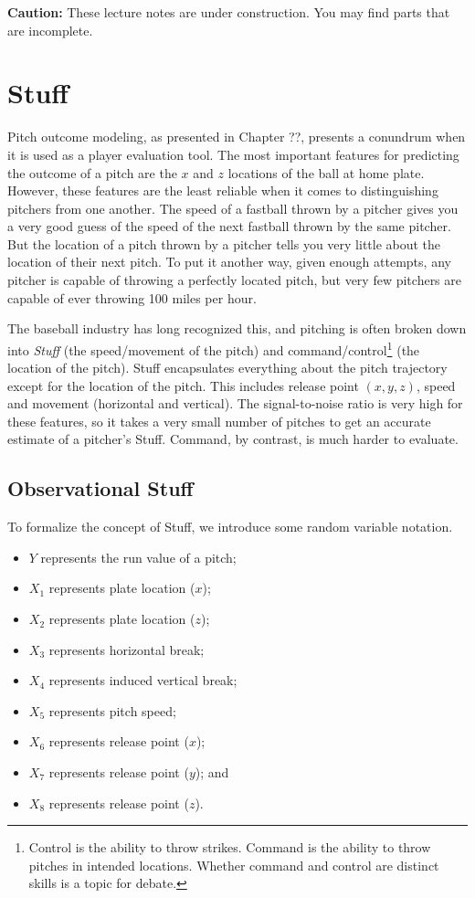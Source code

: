 \documentclass{article}
\begin{document}
\begin{framed}
  {\bf Caution:} These lecture notes are under construction. You may find parts that are incomplete.
\end{framed}

\setcounter{section}{5}
\section{\sc Stuff}

  Pitch outcome modeling, as presented in Chapter ??, presents a conundrum when it is used as a player evaluation tool. The most important features for predicting the outcome of a pitch are the $x$ and $z$ locations of the ball at home plate. However, these features are the least reliable when it comes to distinguishing pitchers from one another. The speed of a fastball thrown by a pitcher gives you a very good guess of the speed of the next fastball thrown by the same pitcher. But the location of a pitch thrown by a pitcher tells you very little about the location of their next pitch. To put it another way, given enough attempts, any pitcher is capable of throwing a perfectly located pitch, but very few pitchers are capable of ever throwing 100 miles per hour.

  The baseball industry has long recognized this, and pitching is often broken down into {\it Stuff} (the speed/movement of the pitch) and command/control\footnote{Control is the ability to throw strikes. Command is the ability to throw pitches in intended locations. Whether command and control are distinct skills is a topic for debate.} (the location of the pitch). Stuff encapsulates everything about the pitch trajectory except for the location of the pitch. This includes release point $(x, y, z)$, speed and movement (horizontal and vertical). The signal-to-noise ratio is very high for these features, so it takes a very small number of pitches to get an accurate estimate of a pitcher's Stuff. Command, by contrast, is much harder to evaluate.

  \subsection{\sc Observational Stuff}

    To formalize the concept of Stuff, we introduce some random variable notation.
    \begin{itemize}
      \item $Y$ represents the run value of a pitch;
      \item $X_1$ represents plate location ($x$);
      \item $X_2$ represents plate location ($z$);
      \item $X_3$ represents horizontal break;
      \item $X_4$ represents induced vertical break;
      \item $X_5$ represents pitch speed;
      \item $X_6$ represents release point ($x$);
      \item $X_7$ represents release point ($y$); and
      \item $X_8$ represents release point ($z$).
    \end{itemize}
\end{document}
